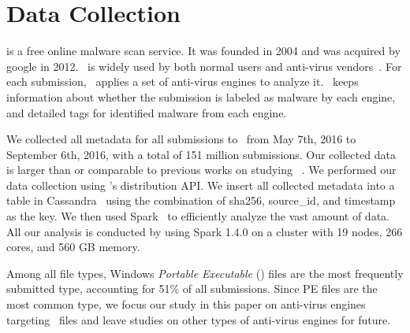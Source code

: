 \vspace{-0.05in}
\section{Data Collection}
\label{sec:meth}


\noindent{\underline{\textit{\vt}}}
is a free online malware scan service.
It was founded in 2004 and was acquired by google in 2012. 
\vt\ is widely used by both normal users and anti-virus vendors~\cite{huangvt2016bigdata, neeles}. 
For each submission, \vt\ applies a set of anti-virus engines to analyze it. 
\vt\ keeps information about whether the submission is labeled as malware by each engine, 
and detailed tags for identified malware from each engine. 


We collected all metadata for all submissions to \vt\ from May 7th, 2016 to September 6th, 2016,
with a total of 151 million submissions. 
Our collected data is larger than or comparable to previous works on studying \vt~\cite{SongAPsys2016,huangvt2016bigdata}.
We performed our data collection using \vt{}'s distribution API.
We insert all collected metadata into a table in Cassandra~\cite{cassandra} 
using the combination of sha256, source\_id, and timestamp as the key.
We then used Spark~\cite{spark} to efficiently analyze the vast amount of data.
All our analysis is conducted by using Spark 1.4.0 on a cluster with 19 nodes, 266 cores, and 560 GB memory. 

Among all file types, Windows \textit{Portable Executable} ({\em \pe}) files 
are the most frequently submitted type,
accounting for 51\% of all submissions.
Since PE files are the most common type,
we focus our study in this paper on anti-virus engines targeting \pe\ files 
and leave studies on other types of anti-virus engines for future. 

